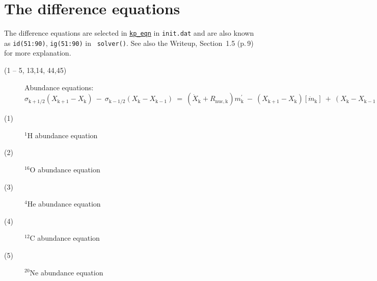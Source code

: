 \hypertarget{difeqs}{} 
\section{The difference equations}
\label{sec:difeqs}

\def\mp{m^{\prime}}
\def\Qp{Q^{\prime}}

The difference equations are selected in \hyperlink{kp_eqn}{\texttt{kp\_eqn}} in \texttt{init.dat}
and are also known as \texttt{id(51:90)}, \texttt{ig(51:90)} in \eg\ \texttt{solver()}.
See also the Writeup, Section~1.5 (p.\,9) for more explanation.


\begin{description}
\item[(1 -- 5, 13,14, 44,45)]   Abundance equations: \\
  $\sigma_{\mathrm{k} +1/2}(X_{\mathrm{k} +1}-X_\mathrm{k })  \ - \   \sigma_{\mathrm{k}-1/2}(X_\mathrm{k }-X_{\mathrm{k} -1}) 
  \  = \  (\dot{X} _\mathrm{k }+R_\mathrm{nuc, k}) \mp _\mathrm{k }  \  - \  (X_{\mathrm{k}+1}-X_\mathrm{k })[\dot{m}_\mathrm{k }] 
  \ + \ (X_\mathrm{k }-X_{\mathrm{k} -1})[-\dot{m}_{\mathrm{k} +1}]$
\item[(1)]   $^1$H abundance equation
\item[(2)]   $^{16}$O abundance equation
\item[(3)]   $^{4}$He abundance equation
\item[(4)]   $^{12}$C abundance equation
\item[(5)]   $^{20}$Ne abundance equation



\end{description}
